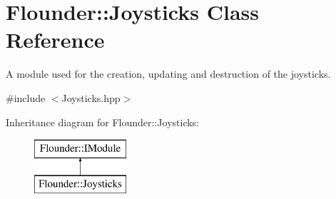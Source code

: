 \hypertarget{class_flounder_1_1_joysticks}{}\section{Flounder\+:\+:Joysticks Class Reference}
\label{class_flounder_1_1_joysticks}


A module used for the creation, updating and destruction of the joysticks.  




{\ttfamily \#include $<$Joysticks.\+hpp$>$}

Inheritance diagram for Flounder\+:\+:Joysticks\+:\begin{figure}[H]
\begin{center}
\leavevmode
\includegraphics[height=2.000000cm]{class_flounder_1_1_joysticks}
\end{center}
\end{figure}
